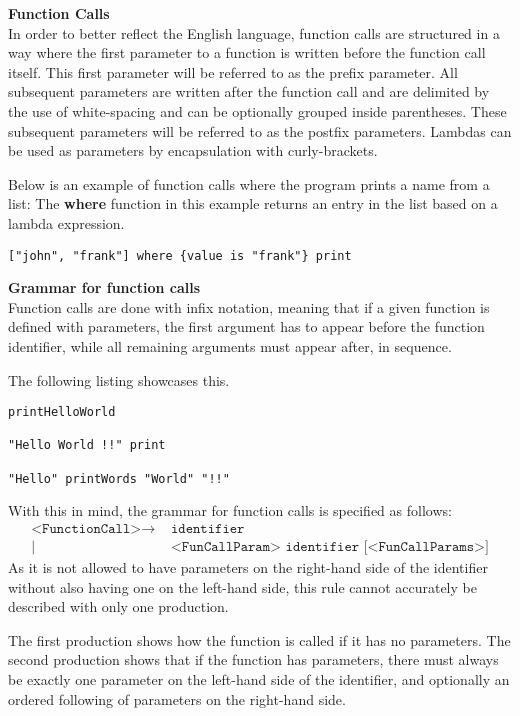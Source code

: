 \textbf{Function Calls}\\
In order to better reflect the English language, function calls are structured in a way where the first parameter to a function is written before the function call itself.
This first parameter will be referred to as the prefix parameter. 
All subsequent parameters are written after the function call and are delimited by the use of white-spacing and can be optionally grouped inside parentheses.
These subsequent parameters will be referred to as the postfix parameters.
Lambdas can be used as parameters by encapsulation with curly-brackets. 

Below is an example of function calls where the program prints a name from a list:
The \textbf{where} function in this example returns an entry in the list based on a lambda expression.
\begin{lstlisting}[language=HCL,label=lis:hclPrintnFromList,firstnumber=1]
["john", "frank"] where {value is "frank"} print
\end{lstlisting}

\textbf{Grammar for function calls}\\
Function calls are done with infix notation, meaning that if a given function is defined with parameters, the first argument has to appear before the function identifier, while all remaining arguments must appear after, in sequence.

The following listing showcases this.
\begin{lstlisting}[language=HCL,caption={Function call notation in HCL.
printHelloWolrd, print and printWords are example functions.
},firstnumber=1]
printHelloWorld

"Hello World !!" print

"Hello" printWords "World" "!!"
\end{lstlisting}

With this in mind, the grammar for function calls is specified as follows:
\begin{align*}
	\texttt{<FunctionCall>}\to & \texttt{ identifier}\\
	| & \texttt{ <FunCallParam> identifier [<FunCallParams>]}
\end{align*}
As it is not allowed to have parameters on the right-hand side of the identifier without also having one on the left-hand side, this rule cannot accurately be described with only one production.

The first production shows how the function is called if it has no parameters.
The second production shows that if the function has parameters, there must always be exactly one parameter on the left-hand side of the identifier, and optionally an ordered following of parameters on the right-hand side.

